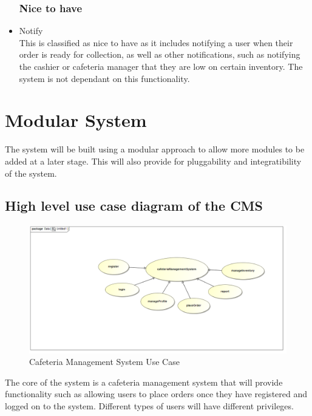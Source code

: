 \documentclass[a4paper,12pt]{article}
\begin{document}
\begin{itemize}
\subsubsection{Nice to have}
\item Notify \\
This is classified as nice to have as it includes notifying a user when their order is ready for collection, as well as other notifications, such as notifying the cashier or cafeteria manager that they are low on certain inventory.  The system is not dependant on this functionality.

\end{itemize}

\section{Modular System}
The system will be built using a modular approach to allow more modules to be added at a later stage. This will also provide for pluggability and integratibility of the system.

\subsection{High level use case diagram of the CMS}
\begin{figure}[H]
  \centering
    \includegraphics[width=1.0\textwidth]{images/CMSUseCase.png}
    \caption{Cafeteria Management System Use Case} 
\end{figure}
The core of the system is a cafeteria management system that will provide functionality such as allowing users to place orders once they have registered and logged on to the system. Different types of users will have different privileges. 
\end{document}
